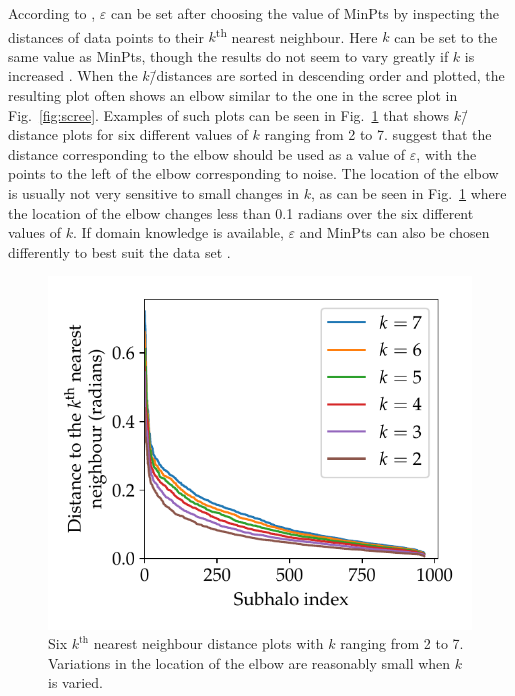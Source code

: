 \documentclass[english, oneside]{HYgradu}
\begin{document}
According to \citet{ester1996density}, $\varepsilon$ can be set after choosing the value of MinPts by inspecting the distances of data points to their $k$\textsuperscript{th} nearest neighbour. Here $k$ can be set to the same value as MinPts, though the results do not seem to vary greatly if $k$ is increased \citep{ester1996density}. When the $k$\=/distances are sorted in descending order and plotted, the resulting plot often shows an elbow similar to the one in the scree plot in Fig.\ \ref{fig:scree}. Examples of such plots can be seen in Fig.\ \ref{fig:k-distances-singlesim} that shows $k$\=/distance plots for six different values of $k$ ranging from 2 to 7. \citet{ester1996density} suggest that the distance corresponding to the elbow should be used as a value of $\varepsilon$, with the points to the left of the elbow corresponding to noise. The location of the elbow is usually not very sensitive to small changes in $k$, as can be seen in Fig.\ \ref{fig:k-distances-singlesim} where the location of the elbow changes less than 0.1 radians over the six different values of $k$. If domain knowledge is available, $\varepsilon$ and MinPts can also be chosen differently to best suit the data set \citep{schubert2017dbscan}.

\begin{figure}
    \centering
    \includegraphics{kuvat/k-distances-singlesim.pdf}
    \caption{Six $k^{\text{th}}$ nearest neighbour distance plots with $k$ ranging from 2 to 7. Variations in the location of the elbow are reasonably small when $k$ is varied.}\label{fig:k-distances-singlesim}
\end{figure}
\end{document}
